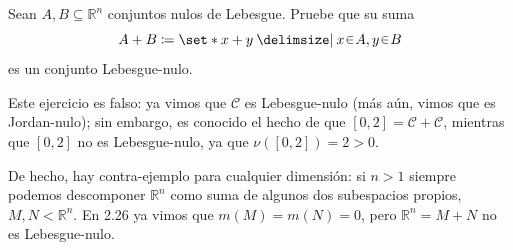 \setcounter{neje}{26}
\begin{nejer}[Falso]
Sean $A, B \subseteq \mathbb{R}^n$ conjuntos nulos de Lebesgue. Pruebe que su suma
$$
A + B \coloneq \set*{x + y \given x \en A, y \en B}
$$
es un conjunto Lebesgue-nulo.
\end{nejer}
\begin{sol}
Este ejercicio es falso: ya vimos que $\mathcal{C}$ es Lebesgue-nulo (más aún, vimos que es Jordan-nulo); sin embargo, es conocido el hecho de que $[0,2] = \mathcal{C} + \mathcal{C}$, mientras que $[0,2]$ no es Lebesgue-nulo, ya que $\nu([0,2]) = 2 > 0$.\par
De hecho, hay contra-ejemplo para cualquier dimensión: si $n>1$ siempre podemos descomponer $\mathbb{R}^n$ como suma de algunos dos subespacios propios, $M,N < \mathbb{R}^n$. En 2.26 ya vimos que $m(M) = m(N) = 0$, pero $\mathbb{R}^n = M + N$ no es Lebesgue-nulo.
\end{sol}